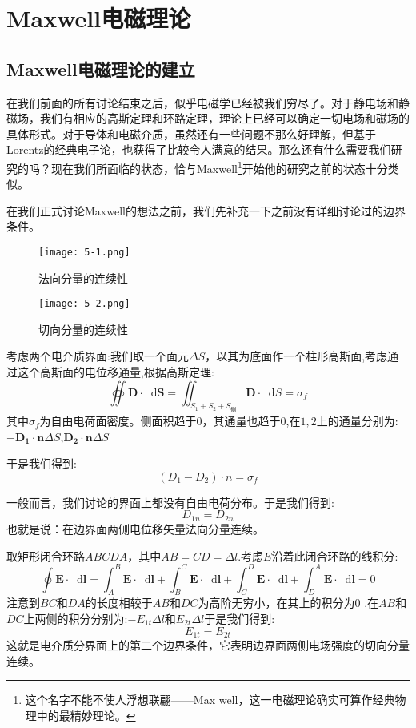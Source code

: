 \documentclass[12pt,a4paper,oneside]{report}
\theoremstyle{definition}
\theoremstyle{remark}
\newcommand{\mb}[1]{\mathbf{#1}}
\renewcommand{\d}{\mathop{}\!\mathrm{d}}
\begin{document}
\chapter{Maxwell电磁理论}
\section{Maxwell电磁理论的建立}
在我们前面的所有讨论结束之后，似乎电磁学已经被我们穷尽了。对于静电场和静磁场，我们有相应的高斯定理和环路定理，理论上已经可以确定一切电场和磁场的具体形式。对于导体和电磁介质，虽然还有一些问题不那么好理解，但基于Lorentz的经典电子论，也获得了比较令人满意的结果。那么还有什么需要我们研究的吗？现在我们所面临的状态，恰与Maxwell\footnote{这个名字不能不使人浮想联翩——Max well，这一电磁理论确实可算作经典物理中的最精妙理论。}开始他的研究之前的状态十分类似。

在我们正式讨论Maxwell的想法之前，我们先补充一下之前没有详细讨论过的边界条件。

\begin{figure}[h]
  \centering
  \begin{minipage}[t]{0.4\textwidth}
    \centering
    \texttt{[image: 5-1.png]}
    \caption{法向分量的连续性}
  \end{minipage}
  \hfill
  \begin{minipage}[t]{0.4\textwidth}
    \centering
    \texttt{[image: 5-2.png]}
    \caption{切向分量的连续性}
  \end{minipage}
\end{figure}

考虑两个电介质界面:我们取一个面元$\Delta S$，以其为底面作一个柱形高斯面,考虑通过这个高斯面的电位移通量,根据高斯定理: 
\[
\oiint \mb{D} \cdot \d \mathbf{S} = \iint_{S_1+S_2+S_{\text{侧}}} \mathbf{D}\cdot \d S = \sigma_f
\]
其中$\sigma_f$为自由电荷面密度。侧面积趋于$0$，其通量也趋于$0$,在$1,2$上的通量分别为:$-\mb{D_1}\cdot \mb{n} \Delta S$,$\mb{D_2}\cdot \mb{n} \Delta S$

于是我们得到:
\[
(D_1-D_2) \cdot n = \sigma_f
\]

一般而言，我们讨论的界面上都没有自由电荷分布。于是我们得到:
\[
D_{1n}=D_{2n}
\]
也就是说：在边界面两侧电位移矢量法向分量连续。

取矩形闭合环路$ABCDA$，其中$AB=CD=\Delta l$.考虑$E$沿着此闭合环路的线积分:
\[
\oint \mb{E} \cdot \d \mb{l} = \int_A^B \mb{E} \cdot \d \mb{l}+ \int_B^C \mb{E} \cdot \d \mb{l}+\int_C^D \mb{E} \cdot \d \mb{l}+\int_D^A \mb{E} \cdot \d \mb{l}=0
\]
注意到$BC$和$DA$的长度相较于$AB$和$DC$为高阶无穷小，在其上的积分为$0$
.在$AB$和$DC$上两侧的积分分别为:$-E_{1t}\Delta l$和$E_{2t}\Delta l$于是我们得到:
\[
E_{1t} = E_{2t}
\]
这就是电介质分界面上的第二个边界条件，它表明边界面两侧电场强度的切向分量连续。
\end{document}
